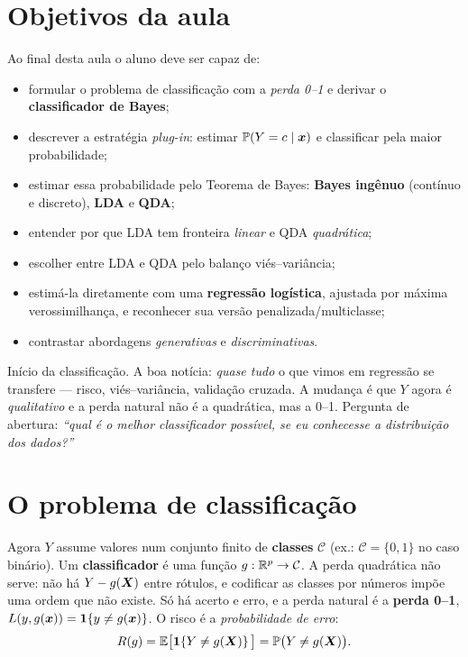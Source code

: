 \documentclass[11pt,a4paper]{article}
\begin{document}

\section*{Objetivos da aula}
Ao final desta aula o aluno deve ser capaz de:
\begin{itemize}[leftmargin=1.4cm]
  \item formular o problema de classificação com a \emph{perda 0--1} e derivar o
        \textbf{classificador de Bayes};
  \item descrever a estratégia \emph{plug-in}: estimar $\mathbb{P}(Y=c\mid\bm{x})$ e
        classificar pela maior probabilidade;
  \item estimar essa probabilidade pelo Teorema de Bayes: \textbf{Bayes ingênuo}
        (contínuo e discreto), \textbf{LDA} e \textbf{QDA};
  \item entender por que LDA tem fronteira \emph{linear} e QDA \emph{quadrática};
  \item escolher entre LDA e QDA pelo balanço viés--variância;
  \item estimá-la diretamente com uma \textbf{regressão logística}, ajustada por
        máxima verossimilhança, e reconhecer sua versão penalizada/multiclasse;
  \item contrastar abordagens \emph{generativas} e \emph{discriminativas}.
\end{itemize}

\begin{emsala}
Início da classificação. A boa notícia: \emph{quase tudo} o que vimos em regressão
se transfere --- risco, viés--variância, validação cruzada. A mudança é que $Y$
agora é \emph{qualitativo} e a perda natural não é a quadrática, mas a 0--1.
Pergunta de abertura: \emph{``qual é o melhor classificador possível, se eu
conhecesse a distribuição dos dados?''}
\end{emsala}

\section{O problema de classificação}
Agora $Y$ assume valores num conjunto finito de \textbf{classes} $\mathcal{C}$ (ex.:
$\mathcal{C}=\{0,1\}$ no caso binário). Um \textbf{classificador} é uma função
$g:\mathbb{R}^p\to\mathcal{C}$. A perda quadrática não serve: não há $Y-g(\bm{X})$ entre rótulos,
e codificar as classes por números impõe uma ordem que não existe. Só há acerto e
erro, e a perda natural é a \textbf{perda 0--1}, $L(y,g(\bm{x}))=\mathbf{1}\!\left\{y\ne g(\bm{x})\right\}$. O
risco é a \emph{probabilidade de erro}:
\begin{equation}\label{eq:risco01}
  R(g) = \mathbb{E}\big[\mathbf{1}\!\left\{Y\ne g(\bm{X})\right\}\big] = \mathbb{P}\big(Y\ne g(\bm{X})\big).
\end{equation}
\end{document}
